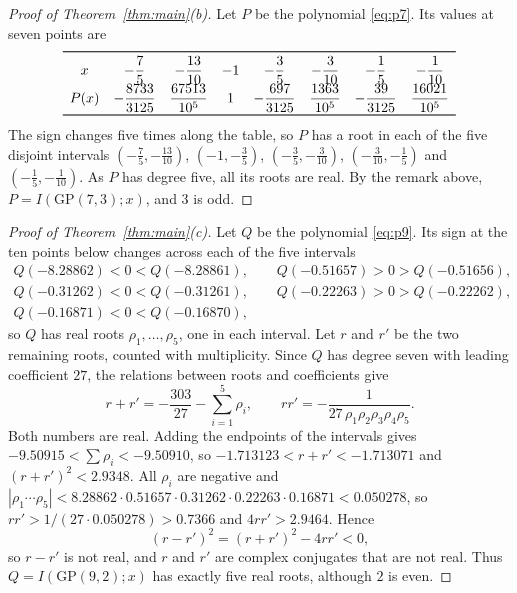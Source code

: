 \documentclass[11pt]{amsart}
\theoremstyle{definition}
\theoremstyle{remark}
\numberwithin{equation}{section}
\newcommand{\GP}{\mathrm{GP}}
\begin{document}
\begin{proof}[Proof of Theorem~\ref{thm:main}(b)]
Let $P$ be the polynomial \eqref{eq:p7}. Its values at seven points are
\[
\renewcommand{\arraystretch}{1.5}
\begin{array}{c*{7}{>{\displaystyle}c}}
\toprule
x & -\frac75 & -\frac{13}{10} & -1 & -\frac35 & -\frac3{10} & -\frac15 & -\frac1{10}\\
P(x) & -\frac{8733}{3125} & \frac{67513}{10^5} & 1 & -\frac{697}{3125} & \frac{1363}{10^5} & -\frac{39}{3125} & \frac{16021}{10^5}\\
\bottomrule
\end{array}
\]
The sign changes five times along the table, so $P$ has a root in each of the five disjoint intervals $(-\frac75,-\frac{13}{10})$, $(-1,-\frac35)$, $(-\frac35,-\frac3{10})$, $(-\frac3{10},-\frac15)$ and $(-\frac15,-\frac1{10})$. As $P$ has degree five, all its roots are real. By the remark above, $P=I(\GP(7,3);x)$, and $3$ is odd.
\end{proof}

\begin{proof}[Proof of Theorem~\ref{thm:main}(c)]
Let $Q$ be the polynomial \eqref{eq:p9}. Its sign at the ten points below changes across each of the five intervals
\[
\begin{gathered}
Q(-8.28862)<0<Q(-8.28861),\qquad Q(-0.51657)>0>Q(-0.51656),\\
Q(-0.31262)<0<Q(-0.31261),\qquad Q(-0.22263)>0>Q(-0.22262),\\
Q(-0.16871)<0<Q(-0.16870),
\end{gathered}
\]
so $Q$ has real roots $\rho_1,\dots,\rho_5$, one in each interval. Let $r$ and $r'$ be the two remaining roots, counted with multiplicity. Since $Q$ has degree seven with leading coefficient $27$, the relations between roots and coefficients give
\[
r+r'=-\frac{303}{27}-\sum_{i=1}^5\rho_i,\qquad rr'=-\frac{1}{27\,\rho_1\rho_2\rho_3\rho_4\rho_5}.
\]
Both numbers are real. Adding the endpoints of the intervals gives $-9.50915<\sum\rho_i<-9.50910$, so $-1.713123<r+r'<-1.713071$ and $(r+r')^2<2.9348$. All $\rho_i$ are negative and $|\rho_1\cdots\rho_5|<8.28862\cdot0.51657\cdot0.31262\cdot0.22263\cdot0.16871<0.050278$, so $rr'>1/(27\cdot0.050278)>0.7366$ and $4rr'>2.9464$. Hence
\[
(r-r')^2=(r+r')^2-4rr'<0,
\]
so $r-r'$ is not real, and $r$ and $r'$ are complex conjugates that are not real. Thus $Q=I(\GP(9,2);x)$ has exactly five real roots, although $2$ is even.
\end{proof}
\end{document}
